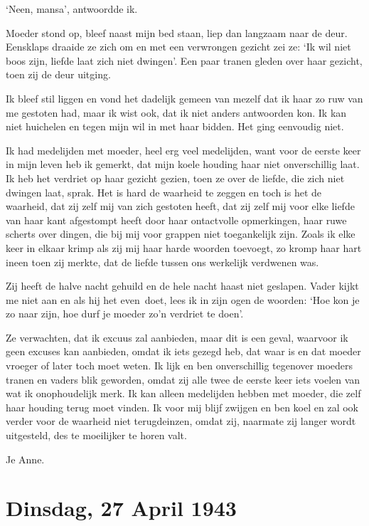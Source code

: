 \documentclass{book}
\begin{document}
`Neen, mansa', antwoordde ik.

Moeder stond op, bleef naast mijn bed staan, liep dan langzaam naar de
deur. Eensklaps draaide ze zich om en met een verwrongen gezicht zei ze:
`Ik wil niet boos zijn, liefde laat zich niet dwingen'. Een paar tranen
gleden over haar gezicht, toen zij de deur uitging.

Ik bleef stil liggen en vond het dadelijk gemeen van mezelf dat ik haar
zo ruw van me gestoten had, maar ik wist ook, dat ik niet anders
antwoorden kon. Ik kan niet huichelen en tegen mijn wil in met haar
bidden. Het ging eenvoudig niet.

Ik had medelijden met moeder, heel erg veel medelijden, want voor de
eerste keer in mijn leven heb ik gemerkt, dat mijn koele houding haar
niet onverschillig laat. Ik heb het verdriet op haar gezicht gezien,
toen ze over de liefde, die zich niet dwingen laat, sprak. Het is hard
de waarheid te zeggen en toch is het de waarheid, dat zij zelf mij van
zich gestoten heeft, dat zij zelf mij voor elke liefde van haar kant
afgestompt heeft door haar ontactvolle opmerkingen, haar ruwe scherts
over dingen, die bij mij voor grappen niet toegankelijk zijn. Zoals ik
elke keer in elkaar krimp als zij mij haar harde woorden toevoegt, zo
kromp haar hart ineen toen zij merkte, dat de liefde tussen ons
werkelijk verdwenen was.

Zij heeft de halve nacht gehuild en de hele nacht haast niet geslapen.
Vader kijkt me niet aan en als hij het even~doet, lees ik in zijn ogen
de woorden: `Hoe kon je zo naar zijn, hoe durf je moeder zo'n verdriet
te doen'.

Ze verwachten, dat ik excuus zal aanbieden, maar dit is een geval,
waarvoor ik geen excuses kan aanbieden, omdat ik iets gezegd heb, dat
waar is en dat moeder vroeger of later toch moet weten. Ik lijk en ben
onverschillig tegenover moeders tranen en vaders blik geworden, omdat
zij alle twee de eerste keer iets voelen van wat ik onophoudelijk merk.
Ik kan alleen medelijden hebben met moeder, die zelf haar houding terug
moet vinden. Ik voor mij blijf zwijgen en ben koel en zal ook verder
voor de waarheid niet terugdeinzen, omdat zij, naarmate zij langer wordt
uitgesteld, des te moeilijker te horen valt.

Je Anne.

\chapter{Dinsdag, 27 April 1943}
\end{document}
